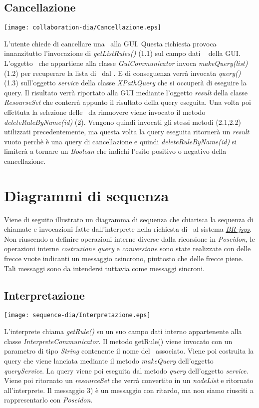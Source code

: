 \subsection{Cancellazione \br}
\begin{center}
 \texttt{[image: collaboration-dia/Cancellazione.eps]}
\end{center}
L'utente chiede di cancellare una \br\ alla GUI. Questa richiesta provoca innanzitutto l'invocazione di \textit{getListRules()} (1.1) sul campo dati \textit{\rp\ } della GUI. L'oggetto \rp\ che appartiene alla classe \textit{GuiCommunicator} invoca \textit{makeQuery(list)} (1.2) per recuperare la lista di \brs\ dal \rp. E di conseguenza verr\`a invocata \textit{query()} (1.3) sull'oggetto \textit{servic}e della classe \textit{XPathQuery} che si occuper\`a di eseguire la query. Il risultato verr\`a riportato alla GUI mediante l'oggetto \textit{result} della classe \textit{ResourseSet} che conterr\`a appunto il risultato della query eseguita. Una volta poi effettuta la selezione delle \brs\ da rimuovere viene invocato il metodo \textit{deleteRuleByName(id)} (2). Vengono quindi invocati gli stessi metodi (2.1,2.2) utilizzati precedentemente, ma questa volta la query eseguita ritorner\`a un \textit{result} vuoto perch\`e \`e una query di cancellazione e quindi \textit{deleteRuleByName(id)} si limiter\`a a tornare un \textit{Boolean} che indichi l'esito positivo o negativo della cancellazione.

\section{Diagrammi di sequenza}
Viene di seguito illustrato un diagramma di sequenza che chiarisca la sequenza di chiamate e invocazioni fatte dall'interprete nella richiesta di \brs\ al sistema \textit{\underline{BR-jsys}}. Non riuscendo a definire operazioni interne diverse dalla ricorsione in \textit{Poseidon}, le operazioni interne \textit{costruzione query} e \textit{conversione} sono state realizzate con delle frecce vuote indicanti un messaggio asincrono, piuttosto che delle frecce piene. Tali messaggi sono da intendersi tuttavia come messaggi sincroni.
\subsection{Interpretazione}
\begin{center}
 \texttt{[image: sequence-dia/Interpretazione.eps]}
\end{center}
L'interprete chiama \textit{getRule()} su un suo campo dati interno appartenente alla classe \textit{InterpreteCommunicator}. Il metodo getRule() viene invocato con un parametro di tipo \textit{String} contenente il nome del \bo\ associato. Viene poi costruita la query che viene lanciata mediante il metodo \textit{makeQuery} dell'oggetto \textit{queryService}. La query viene poi eseguita dal metodo \textit{query} dell'oggetto \textit{service}. Viene poi ritornato un \textit{resourceSet} che verr\`a convertito in un \textit{nodeList} e ritornato all'interprete. Il messaggio 3) \`e un messaggio con ritardo, ma non siamo riusciti a rappresentarlo con \textit{Poseidon}.

